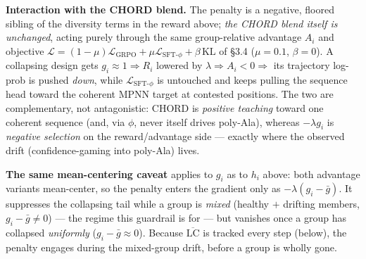 \documentclass[11pt]{article}
\begin{document}
\textbf{Interaction with the CHORD blend.} The penalty is a negative, floored sibling of the diversity
terms in the reward above; \emph{the CHORD blend itself is unchanged}, acting purely through the same
group-relative advantage $A_i$ and objective $\mathcal L=(1-\mu)\mathcal L_{\mathrm{GRPO}}+\mu\mathcal
L_{\text{SFT-}\phi}+\beta\,\mathrm{KL}$ of \S3.4 ($\mu{=}0.1$, $\beta{=}0$). A collapsing
design gets $g_i\!\approx\!1\Rightarrow R_i$ lowered by $\lambda\Rightarrow A_i<0\Rightarrow$ its
trajectory log-prob is pushed \emph{down}, while $\mathcal L_{\text{SFT-}\phi}$ is untouched and keeps
pulling the sequence head toward the coherent MPNN target at contested positions. The two are
complementary, not antagonistic: CHORD is \emph{positive teaching} toward one coherent sequence (and, via
$\phi$, never itself drives poly-Ala), whereas $-\lambda g_i$ is \emph{negative selection} on the
reward/advantage side --- exactly where the observed drift (confidence-gaming into poly-Ala) lives.

\textbf{The same mean-centering caveat} applies to $g_i$ as to $h_i$ above: both advantage variants
mean-center, so the penalty enters the gradient only as $-\lambda(g_i-\bar g)$. It suppresses the
collapsing tail while a group is \emph{mixed} (healthy $+$ drifting members, $g_i-\bar g\neq0$) --- the
regime this guardrail is for --- but vanishes once a group has collapsed \emph{uniformly}
($g_i-\bar g\!\approx\!0$). Because $\overline{\mathrm{LC}}$ is tracked every step (below), the penalty
engages during the mixed-group drift, before a group is wholly gone.
\end{document}
